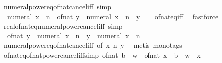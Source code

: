 \begin{isabellebody}
\ numeral{\isacharunderscore}{\kern0pt}power{\isacharunderscore}{\kern0pt}eq{\isacharunderscore}{\kern0pt}of{\isacharunderscore}{\kern0pt}nat{\isacharunderscore}{\kern0pt}cancel{\isacharunderscore}{\kern0pt}iff\ {\isacharbrackleft}{\kern0pt}simp{\isacharbrackright}{\kern0pt}{\isacharcolon}{\kern0pt}\isanewline
\ \ {\isachardoublequoteopen}numeral\ x\ {\isacharcircum}{\kern0pt}\ n\ {\isacharequal}{\kern0pt}\ of{\isacharunderscore}{\kern0pt}nat\ y\ {\isasymlongleftrightarrow}\ numeral\ x\ {\isacharcircum}{\kern0pt}\ n\ {\isacharequal}{\kern0pt}\ y{\isachardoublequoteclose}\isanewline
%
\isadelimproof
\ \ %
\endisadelimproof
%
\isatagproof
{}\isamarkupfalse%
\ of{\isacharunderscore}{\kern0pt}nat{\isacharunderscore}{\kern0pt}eq{\isacharunderscore}{\kern0pt}iff\ \isamarkupfalse%
\ fastforce%
\endisatagproof
{\isafoldproof}%
%
\isadelimproof
\isanewline
%
\endisadelimproof
\isanewline
{}\isamarkupfalse%
\ real{\isacharunderscore}{\kern0pt}of{\isacharunderscore}{\kern0pt}nat{\isacharunderscore}{\kern0pt}eq{\isacharunderscore}{\kern0pt}numeral{\isacharunderscore}{\kern0pt}power{\isacharunderscore}{\kern0pt}cancel{\isacharunderscore}{\kern0pt}iff\ {\isacharbrackleft}{\kern0pt}simp{\isacharbrackright}{\kern0pt}{\isacharcolon}{\kern0pt}\isanewline
\ \ {\isachardoublequoteopen}of{\isacharunderscore}{\kern0pt}nat\ y\ {\isacharequal}{\kern0pt}\ numeral\ x\ {\isacharcircum}{\kern0pt}\ n\ {\isasymlongleftrightarrow}\ y\ {\isacharequal}{\kern0pt}\ numeral\ x\ {\isacharcircum}{\kern0pt}\ n{\isachardoublequoteclose}\isanewline
%
\isadelimproof
\ \ %
\endisadelimproof
%
\isatagproof
{}\isamarkupfalse%
\ numeral{\isacharunderscore}{\kern0pt}power{\isacharunderscore}{\kern0pt}eq{\isacharunderscore}{\kern0pt}of{\isacharunderscore}{\kern0pt}nat{\isacharunderscore}{\kern0pt}cancel{\isacharunderscore}{\kern0pt}iff\ {\isacharbrackleft}{\kern0pt}of\ x\ n\ y{\isacharbrackright}{\kern0pt}\ \isamarkupfalse%
\ {\isacharparenleft}{\kern0pt}metis\ {\isacharparenleft}{\kern0pt}mono{\isacharunderscore}{\kern0pt}tags{\isacharparenright}{\kern0pt}{\isacharparenright}{\kern0pt}%
\endisatagproof
{\isafoldproof}%
%
\isadelimproof
\isanewline
%
\endisadelimproof
\isanewline
{}\isamarkupfalse%
\ of{\isacharunderscore}{\kern0pt}nat{\isacharunderscore}{\kern0pt}eq{\isacharunderscore}{\kern0pt}of{\isacharunderscore}{\kern0pt}nat{\isacharunderscore}{\kern0pt}power{\isacharunderscore}{\kern0pt}cancel{\isacharunderscore}{\kern0pt}iff{\isacharbrackleft}{\kern0pt}simp{\isacharbrackright}{\kern0pt}{\isacharcolon}{\kern0pt}\ {\isachardoublequoteopen}{\isacharparenleft}{\kern0pt}of{\isacharunderscore}{\kern0pt}nat\ b{\isacharparenright}{\kern0pt}\ {\isacharcircum}{\kern0pt}\ w\ {\isacharequal}{\kern0pt}\ of{\isacharunderscore}{\kern0pt}nat\ x\ {\isasymlongleftrightarrow}\ b\ {\isacharcircum}{\kern0pt}\ w\ {\isacharequal}{\kern0pt}\ x{\isachardoublequoteclose}\isanewline

\end{isabellebody}

